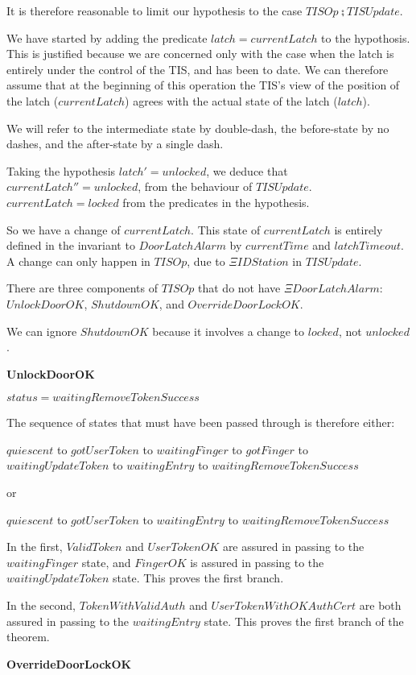It is therefore reasonable to limit our hypothesis to the case
$TISOp \semi TISUpdate$.

We have started by adding the predicate $latch = currentLatch$
to the hypothosis.
This is justified because we are concerned only with the case when
the latch is entirely under the control of the TIS,
and has been to date.
We can therefore assume that at the beginning of this operation
the TIS's view of the position of the latch
($currentLatch$) agrees with the actual state of the latch ($latch$).

We will refer to the intermediate state by double-dash, the before-state
by no dashes, and the after-state by a single dash.

Taking the hypothesis $latch' = unlocked$,
we deduce that $currentLatch''=unlocked$,
from the behaviour of $TISUpdate$.
$currentLatch = locked$ from the predicates in the hypothesis.

So we have a change of $currentLatch$.
This state of $currentLatch$ is entirely defined in the invariant to
$DoorLatchAlarm$ by $currentTime$ and $latchTimeout$.
A change can only happen in $TISOp$, due to $\Xi IDStation$ in $TISUpdate$.

There are three components of $TISOp$ that do not have 
$\Xi DoorLatchAlarm$:
$UnlockDoorOK$,
$ShutdownOK$,
and $OverrideDoorLockOK$.

We can ignore $ShutdownOK$ because it involves a change to $locked$,
not $unlocked$.

{\bf UnlockDoorOK}

$status = waitingRemoveTokenSuccess$

The sequence of states that must have been passed through is therefore either:

$quiescent$ to $gotUserToken$ to $waitingFinger$ to $gotFinger$ to 
$waitingUpdateToken$ to $waitingEntry$ to $waitingRemoveTokenSuccess$

or

$quiescent$ to $gotUserToken$ to 
$waitingEntry$ to $waitingRemoveTokenSuccess$

In the first, $ValidToken$ and $UserTokenOK$ are assured in passing 
to the $waitingFinger$
state,
and $FingerOK$ is assured in passing to the $waitingUpdateToken$ state.
This proves the first branch.

In the second, $TokenWithValidAuth$ and $UserTokenWithOKAuthCert$ are both
assured in passing to the $waitingEntry$ state.
This proves the first branch of the theorem.

{\bf OverrideDoorLockOK}

